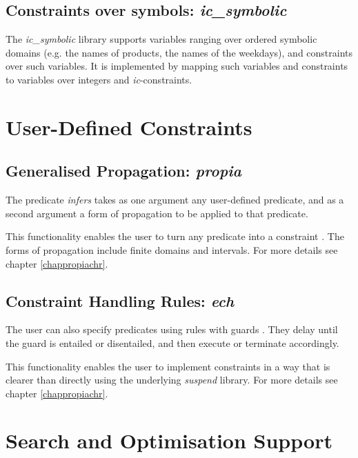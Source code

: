 \subsection{Constraints over symbols: {\em ic\_symbolic}}
\label{shortsecsymbolic}
The {\em ic\_symbolic} library supports variables ranging over ordered
symbolic domains (e.g. the names of products, the names of the weekdays),
and constraints over such variables. It is implemented by mapping such
variables and constraints to variables over integers and {\em ic}-constraints.


\section{User-Defined Constraints}
\subsection{Generalised Propagation: {\em propia}}
\label{shortsecpropia}
The predicate {\em infers} takes as one argument
any user-defined predicate, and as a second argument a form of
propagation to be applied to that predicate.

This functionality enables the user to turn any predicate into a
constraint \cite{LeProvost93b}. The forms of propagation include finite
domains and intervals.
For more details see chapter \ref{chappropiachr}.

\subsection{Constraint Handling Rules: {\em ech}}
\label{shortsecech}
The user can also specify predicates using rules with guards
\cite{Fruehwirth}.  
They delay until the guard is entailed or disentailed, and then
execute or terminate accordingly. 

This functionality enables the user to implement constraints in a way
that is clearer than directly using the underlying {\em suspend}
library.
For more details see chapter \ref{chappropiachr}.


\section{Search and Optimisation Support}

